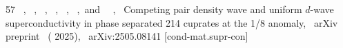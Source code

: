 \documentclass[floatfix,aps,twocolumn,preprintnumbers,superscriptaddress,floatfix,prl]{revtex4-2}
\begin{document}
\begin{thebibliography}{57}
  \BibitemOpen
   { {~},  {~},  {~},  {\ },  {\ },  {~},\ and\  {\ },\ } { {Competing pair density wave and uniform $d$-wave superconductivity in phase separated 214 cuprates at the 1/8 anomaly},\ }\href@noop {} { { {arXiv preprint}\ } ( {2025})},\  {arXiv:2505.08141 [cond-mat.supr-con]} 
\end{thebibliography}
\end{document}
